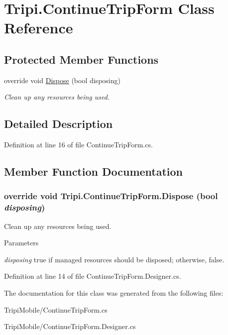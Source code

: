 \hypertarget{class_tripi_1_1_continue_trip_form}{
\section{Tripi.ContinueTripForm Class Reference}
\label{class_tripi_1_1_continue_trip_form}
}
\subsection*{Protected Member Functions}
\begin{DoxyCompactItemize}
\item 
override void \hyperlink{class_tripi_1_1_continue_trip_form_af2ff46f912c1eb174031386284f6c4c1}{Dispose} (bool disposing)
\begin{DoxyCompactList}\small\item\em Clean up any resources being used. \item\end{DoxyCompactList}\end{DoxyCompactItemize}


\subsection{Detailed Description}


Definition at line 16 of file ContinueTripForm.cs.

\subsection{Member Function Documentation}
\hypertarget{class_tripi_1_1_continue_trip_form_af2ff46f912c1eb174031386284f6c4c1}{
\subsubsection[{Dispose}]{\setlength{\rightskip}{0pt plus 5cm}override void Tripi.ContinueTripForm.Dispose (bool {\em disposing})}}
\label{class_tripi_1_1_continue_trip_form_af2ff46f912c1eb174031386284f6c4c1}


Clean up any resources being used. 
\begin{DoxyParams}{Parameters}
\item[{\em disposing}]true if managed resources should be disposed; otherwise, false.\end{DoxyParams}


Definition at line 14 of file ContinueTripForm.Designer.cs.

The documentation for this class was generated from the following files:\begin{DoxyCompactItemize}
\item 
TripiMobile/ContinueTripForm.cs\item 
TripiMobile/ContinueTripForm.Designer.cs\end{DoxyCompactItemize}
